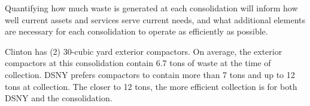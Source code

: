 
    Quantifying how much waste is generated at each consolidation will inform how well current assets and services serve current needs, and what additional elements are necessary for each consolidation to operate as efficiently as possible.
    
    Clinton has (2) 30-cubic yard exterior compactors. On average, the exterior compactors at this consolidation contain 6.7 tons of waste at the time of collection. DSNY prefers compactors to contain more than 7 tons and up to 12 tons at collection. The closer to 12 tons, the more efficient collection is for both DSNY and the consolidation.